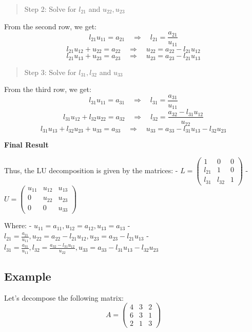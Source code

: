 \documentclass[
  letterpaper,
  DIV=11,
  numbers=noendperiod]{scrreprt}
\theoremstyle{plain}
\theoremstyle{definition}
\theoremstyle{remark}
\begin{document}
\begin{quote}
Step 2: Solve for \(l_{21}\) and \(u_{22}, u_{23}\)
\end{quote}

From the second row, we get:
\[l_{21}u_{11} = a_{21} \quad \Rightarrow \quad l_{21} = \frac{a_{21}}{u_{11}}\]
\[l_{21}u_{12} + u_{22} = a_{22} \quad \Rightarrow \quad u_{22} = a_{22} - l_{21}u_{12}\]
\[l_{21}u_{13} + u_{23} = a_{23} \quad \Rightarrow \quad u_{23} = a_{23} - l_{21}u_{13}\]

\begin{quote}
Step 3: Solve for \(l_{31}, l_{32}\) and \(u_{33}\)
\end{quote}

From the third row, we get:
\[l_{31}u_{11} = a_{31} \quad \Rightarrow \quad l_{31} = \frac{a_{31}}{u_{11}}\]
\[l_{31}u_{12} + l_{32}u_{22} = a_{32} \quad \Rightarrow \quad l_{32} = \frac{a_{32} - l_{31}u_{12}}{u_{22}}\]
\[l_{31}u_{13} + l_{32}u_{23} + u_{33} = a_{33} \quad \Rightarrow \quad u_{33} = a_{33} - l_{31}u_{13} - l_{32}u_{23}\]

\textbf{Final Result}

Thus, the LU decomposition is given by the matrices: -
\(L = \begin{pmatrix}
1 & 0 & 0 \\
l_{21} & 1 & 0 \\
l_{31} & l_{32} & 1
\end{pmatrix}\) - \(U = \begin{pmatrix}
u_{11} & u_{12} & u_{13} \\
0 & u_{22} & u_{23} \\
0 & 0 & u_{33}
\end{pmatrix}\)

Where: - \(u_{11} = a_{11}, u_{12} = a_{12}, u_{13} = a_{13}\) -
\(l_{21} = \frac{a_{21}}{u_{11}}, u_{22} = a_{22} - l_{21}u_{12}, u_{23} = a_{23} - l_{21}u_{13}\)
-
\(l_{31} = \frac{a_{31}}{u_{11}}, l_{32} = \frac{a_{32} - l_{31}u_{12}}{u_{22}}, u_{33} = a_{33} - l_{31}u_{13} - l_{32}u_{23}\)

\subsection{Example}\label{example}

Let's decompose the following matrix:
\[A = \begin{pmatrix} 4 & 3 & 2 \\6 & 3 & 1 \\2 & 1 & 3\end{pmatrix}\]
\end{document}
